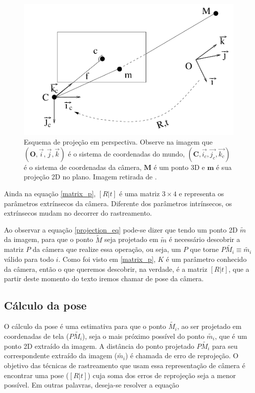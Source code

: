 \begin{figure}[!ht]
\centering\includegraphics[width=5in]{monografia/projection_scheme.png}
\caption{Esquema de projeção em perspectiva. Observe na imagem que $(\mathbf{O}, \vec{i}, \vec{j}, \vec{k})$ é o sistema de coordenadas do mundo, $(\mathbf{C}, \vec{i_c}, \vec{j_c}, \vec{k_c})$ é o sistema de coordenadas da câmera, $\mathbf{M}$ é um ponto 3D e $\mathbf{m}$ é sua projeção 2D no plano. Imagem retirada de \cite{lepetit}.}
\label{projection_scheme}
\end{figure}

Ainda na equação \eqref{matrix_p}, $[R | t]$ é uma matriz $3 \times 4$ e representa os parâmetros extrínsecos da câmera. Diferente dos parâmetros intrínsecos, os extrínsecos mudam no decorrer do rastreamento.

Ao observar a equação \eqref{projection_eq} pode-se dizer que tendo um ponto 2D $\tilde{m}$ da imagem, para que o ponto $\tilde{M}$ seja projetado em $\tilde{m}$ é necessário descobrir a matriz $P$ da câmera que realize essa operação, ou seja, um $P$ que torne $P\tilde{M_i} \equiv \tilde{m_i}$ válido para todo $i$. Como foi visto em \eqref{matrix_p}, $K$ é um parâmetro conhecido da câmera, então o que queremos descobrir, na verdade, é a matriz $[R | t]$, que a partir deste momento do texto iremos chamar de pose da câmera.

\subsection{Cálculo da pose}

O cálculo da pose é uma estimativa para que o ponto $\tilde{M_i}$, ao ser projetado em coordenadas de tela ($P\tilde{M_i}$), seja o mais próximo possível do ponto $\tilde{m_i}$, que é um ponto 2D extraído da imagem. A distância do ponto projetado $P\tilde{M_i}$ para seu correspondente extraído da imagem ($\tilde{m_i}$) é chamada de erro de reprojeção. O objetivo das técnicas de rastreamento que usam essa representação de câmera é encontrar uma pose ($[R | t]$) cuja soma dos erros de reprojeção seja a menor possível. Em outras palavras, deseja-se resolver a equação

